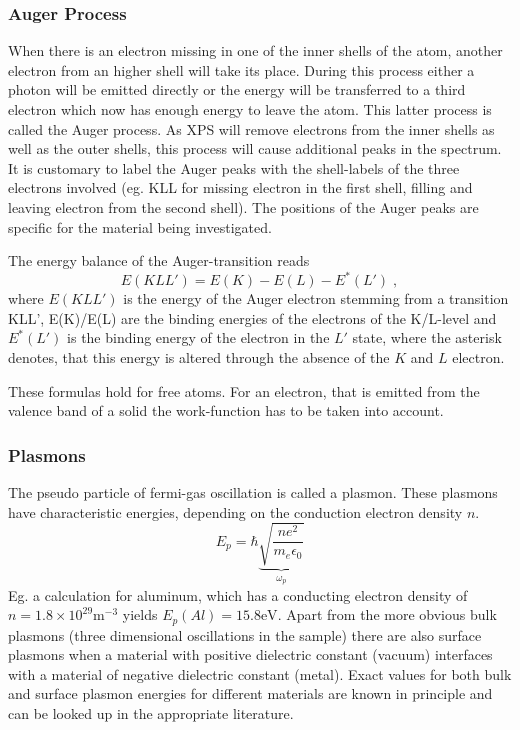 \documentclass[a4paper]{scrartcl}
\numberwithin{equation}{section}
\numberwithin{figure}{section}
\numberwithin{table}{section}
\newcommand{\eq}[2]{\begin{equation}#1\label{#2}\end{equation}}
\begin{document}
\subsubsection{Auger Process}
When there is an electron missing in one of the inner shells of the atom, another electron from an higher shell will take its place. During this process either a photon will be emitted directly or the energy will be transferred to a third electron which now has enough energy to leave the atom. This latter process is called the Auger process. As XPS will remove electrons from the inner shells as well as the outer shells, this process will cause additional peaks in the spectrum. It is customary to label the Auger peaks with the shell-labels of the three electrons involved (eg. KLL for missing electron in the first shell, filling and leaving electron from the second shell). The positions of the Auger peaks are specific for the material being investigated.

The energy balance of the Auger-transition reads
\eq{E(KLL') = E(K) -E(L) - E^{*}(L') \; ,}{EKLL}
where $E(KLL')$ is the energy of the Auger electron stemming from a transition KLL', E(K)/E(L) are the binding energies of the electrons of the K/L-level and $E^*(L')$ is the binding energy of the electron in the $L'$ state, where the asterisk denotes, that this energy is altered through the absence of the $K$ and $L$ electron.

These formulas hold for free atoms. For an electron, that is emitted from the valence band of a solid the work-function has to be taken into account.


\subsubsection{Plasmons}
\label{sec:plasmonIntro}
The pseudo particle of fermi-gas oscillation is called a plasmon. These plasmons have characteristic energies, depending on the conduction electron density $n$. 
$$E_p = \hbar \underbrace{\sqrt{\frac{ne^2}{m_e \epsilon_0}}}_{\omega_p}$$
Eg. a calculation for aluminum, which has a conducting electron density of $n=1.8 \times 10^{29} \text{m}^{-3}$ yields $E_p(Al)=15.8 \text{eV}$.
Apart from the more obvious bulk plasmons (three dimensional oscillations in the sample) there are also surface plasmons when a material with positive dielectric constant (vacuum) interfaces with a material of negative dielectric constant (metal). Exact values for both bulk and surface plasmon energies for different materials are known in principle and can be looked up in the appropriate literature.
\end{document}
